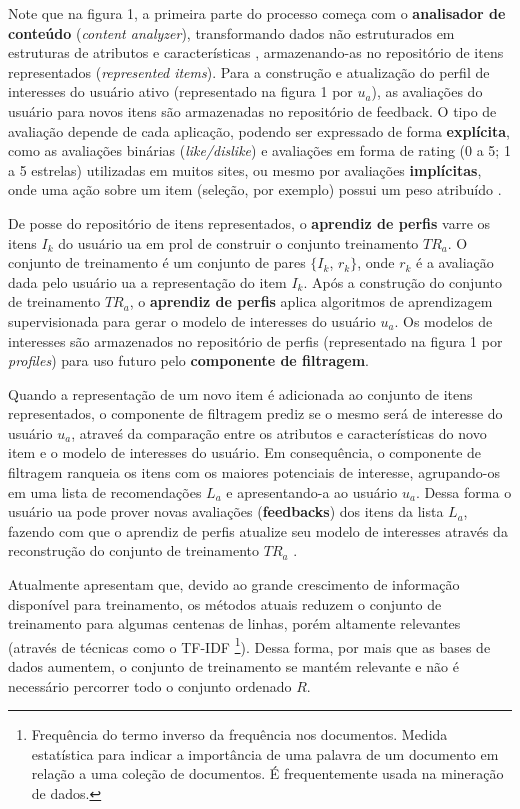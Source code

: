 \documentclass[12pt, openright, oneside, a4paper, brazil]{abntex2}
\begin{document}
Note que na figura 1, a primeira parte do processo começa com o \textbf{analisador de conteúdo} (\textit{content analyzer}), transformando dados não estruturados em estruturas de atributos e características \cite{lops2011content, mladenic1999text}, armazenando-as no repositório de itens representados (\textit{represented items}). Para a construção e atualização do perfil de interesses do usuário ativo (representado na figura 1 por $u_{a}$), as avaliações do usuário para novos itens são armazenadas no repositório de feedback. O tipo de avaliação depende de cada aplicação, podendo ser expressado de forma \textbf{explícita}, como as avaliações binárias (\textit{like/dislike}) e avaliações em forma de rating (0 a 5; 1 a 5 estrelas) utilizadas em muitos sites, ou mesmo por avaliações \textbf{implícitas}, onde uma ação sobre um item (seleção, por exemplo) possui um peso atribuído \cite{pazzani2007content}.

De posse do repositório de itens representados, o \textbf{aprendiz de perfis} varre os itens $I_{k}$ do usuário ua em prol de construir o conjunto treinamento $TR_{a}$. O conjunto de treinamento é um conjunto de pares $\lbrace I_{k}$, $r_{k} \rbrace$, onde $r_{k}$ é a avaliação dada pelo usuário ua a representação do item $I_{k}$. Após a construção do conjunto de treinamento $TR_{a}$, o \textbf{aprendiz de perfis} aplica algoritmos de aprendizagem supervisionada para gerar o modelo de interesses do usuário $u_{a}$. Os modelos de interesses são armazenados no repositório de perfis (representado na figura 1 por \textit{profiles}) para uso futuro pelo \textbf{componente de filtragem}.

Quando a representação de um novo item é adicionada ao conjunto de itens representados, o componente de filtragem prediz se o mesmo será de interesse do usuário $u_{a}$, atraveś da comparação entre os atributos e características do novo item e o modelo de interesses do usuário. Em consequência, o componente de filtragem ranqueia os itens com os maiores potenciais de interesse, agrupando-os em uma lista de recomendações $L_{a}$ e apresentando-a ao usuário $u_{a}$. Dessa forma o usuário ua pode prover novas avaliações (\textbf{feedbacks}) dos itens da lista $L_{a}$, fazendo com que o aprendiz de perfis atualize seu modelo de interesses através da reconstrução do conjunto de treinamento $TR_{a}$ \cite{lops2011content}.

Atualmente  apresentam que, devido ao grande crescimento de informação disponível para treinamento, os métodos atuais reduzem o conjunto de treinamento para algumas centenas de linhas, porém altamente relevantes (através de técnicas como o TF-IDF \footnote{Frequência do termo inverso da frequência nos documentos. Medida estatística para indicar a importância de uma palavra de um documento em relação a uma coleção de documentos. É frequentemente usada na mineração de dados.}). Dessa forma, por mais que as bases de dados aumentem, o conjunto de treinamento se mantém relevante e não é necessário percorrer todo o conjunto ordenado $R$.
\end{document}

